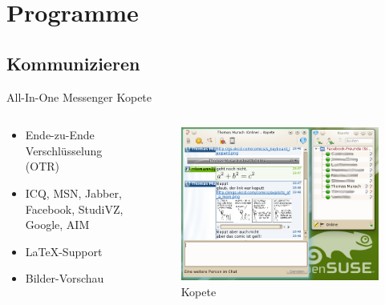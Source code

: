 \section{Programme}

\subsection{Kommunizieren}

\begin{frame}{All-In-One Messenger Kopete}
  \begin{columns}
    \begin{column}{0.45\textwidth}
      \begin{itemize}
        \item Ende-zu-Ende Verschlüsselung (OTR)
        \item ICQ, MSN, Jabber, Facebook, StudiVZ, Google, AIM
        \item \LaTeX-Support
        \item Bilder-Vorschau
      \end{itemize}      
    \end{column}
    \begin{column}{0.55\textwidth}
      \begin{figure}
        \includegraphics[bb=0 0 493 382,keepaspectratio=true,width=\textwidth]{kopete}
        \caption{Kopete}
      \end{figure}
    \end{column}
  \end{columns}
\end{frame}

